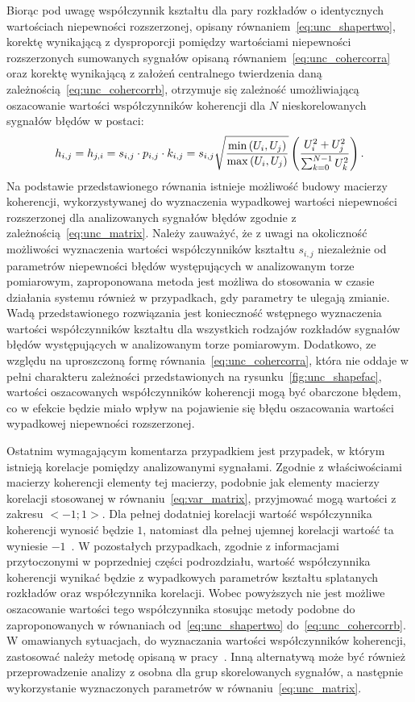 Biorąc pod uwagę współczynnik kształtu dla pary rozkładów o identycznych wartościach niepewności rozszerzonej, opisany równaniem~\eqref{eq:unc_shapertwo}, korektę wynikającą z dysproporcji pomiędzy wartościami niepewności rozszerzonych sumowanych sygnałów opisaną równaniem~\eqref{eq:unc_cohercorra} oraz korektę wynikającą z założeń centralnego twierdzenia daną zależnością~\eqref{eq:unc_cohercorrb}, otrzymuje się zależność umożliwiającą oszacowanie wartości współczynników koherencji dla $N$ nieskorelowanych sygnałów błędów w postaci:
\begin{equation}
h_{i,j} = h_{j,i} = s_{i,j} \cdot p_{i,j} \cdot k_{i,j} = s_{i,j} \sqrt{\frac{\min \left(U_{i}, U_{j}\right)}{\max \left(U_{i}, U_{j}\right)}} \left( \frac{U_{i}^{2} + U_{j}^{2}}{\sum _{k = 0} ^{N-1} U_{k}^{2}} \right) \label{eq:unc_coher}.
\end{equation}
Na podstawie przedstawionego równania istnieje możliwość budowy macierzy koherencji, wykorzystywanej do wyznaczenia wypadkowej wartości niepewności rozszerzonej dla analizowanych sygnałów błędów zgodnie z zależnością~\eqref{eq:unc_matrix}. Należy zauważyć, że z uwagi na okoliczność możliwości wyznaczenia wartości współczynników kształtu $s_{i,j}$ niezależnie od parametrów niepewności błędów występujących w analizowanym torze pomiarowym, zaproponowana metoda jest możliwa do stosowania w czasie działania systemu również w przypadkach, gdy parametry te ulegają zmianie. Wadą przedstawionego rozwiązania jest konieczność wstępnego wyznaczenia wartości współczynników kształtu dla wszystkich rodzajów rozkładów sygnałów błędów występujących w analizowanym torze pomiarowym. Dodatkowo, ze względu na uproszczoną formę równania~\eqref{eq:unc_cohercorra}, która nie oddaje w pełni charakteru zależności przedstawionych na rysunku~\ref{fig:unc_shapefac}, wartości oszacowanych współczynników koherencji mogą być obarczone błędem, co w efekcie będzie miało wpływ na pojawienie się błędu oszacowania wartości wypadkowej niepewności rozszerzonej.

Ostatnim wymagającym komentarza przypadkiem jest przypadek, w którym istnieją korelacje pomiędzy analizowanymi sygnałami. Zgodnie z właściwościami macierzy koherencji elementy tej macierzy, podobnie jak elementy macierzy korelacji stosowanej w równaniu~\eqref{eq:var_matrix}, przyjmować mogą wartości z zakresu $<-1;1>$. Dla pełnej dodatniej korelacji wartość współczynnika koherencji wynosić będzie $1$, natomiast dla pełnej ujemnej korelacji wartość ta wyniesie $-1$~\cite{jakubiec_redmono}. W pozostałych przypadkach, zgodnie z informacjami przytoczonymi w poprzedniej części podrozdziału, wartość współczynnika koherencji wynikać będzie z wypadkowych parametrów kształtu splatanych rozkładów oraz współczynnika korelacji. Wobec powyższych nie jest możliwe oszacowanie wartości tego współczynnika stosując metody podobne do zaproponowanych w równaniach od~\eqref{eq:unc_shapertwo} do~\eqref{eq:unc_cohercorrb}. W omawianych sytuacjach, do wyznaczania wartości współczynników koherencji, zastosować należy metodę opisaną w pracy~\cite{jakubiec_reductive}. Inną alternatywą może być również przeprowadzenie analizy z osobna dla grup skorelowanych sygnałów, a następnie wykorzystanie wyznaczonych parametrów w równaniu~\eqref{eq:unc_matrix}.

